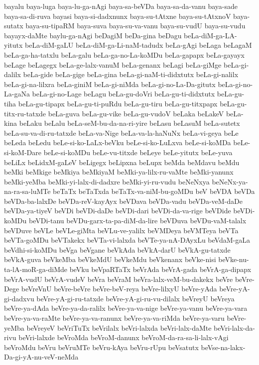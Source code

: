 {bayalu
baya-luga
baya-lu-ga-nAgi
baya-sa-beVDa
baya-sa-da-vanu
baya-sade
baya-sa-di-ruva
bayasi
baya-si-dadxnunx
baya-su-tAtxne
baya-su-tAtxnoV
baya-sutatx
baya-su-tipaRM
baya-suva
baya-su-va-vanu
baya-su-vudU
baya-su-vudu
bayayx-daMte
baylu-ga-nAgi
beDagiM
beDa-gina
beDagu
beLa-diM-ga-LA-yitutx
beLa-diM-gaLU
beLa-diM-ga-Li-naM-tadudx
beLa-gAgi
beLaga
beLagaM
beLa-ga-ha-tatxlu
beLa-galu
beLa-ga-no-La-koMDu
beLa-gapapx
beLa-gayayx
beLage
beLagegx
beLa-ge-lalx-vanuM
beLa-genanx
beLagi
beLa-giMge
beLa-gi-dalilx
beLa-gide
beLa-gige
beLa-gina
beLa-gi-naM-ti-didxtutx
beLa-gi-nalilx
beLa-gi-na-lilxra
beLa-giniM
beLa-gi-niMda
beLa-gi-no-La-Da-gitutx
beLa-gi-no-La-gaNa
beLa-gi-no-Lage
beLagu
beLa-gu-doVri
beLa-gu-ti-didxtutx
beLa-gu-tiha
beLa-gu-tipapx
beLa-gu-ti-puRdu
beLa-gu-tiru
beLa-gu-titxpapx
beLa-gu-titx-ru-tatxde
beLa-guva
beLa-gu-vike
beLa-gu-vudoV
beLaka
beLakeV
beLa-kina
beLaku
beLalu
beLa-seM-bu-da-na-ri-yire
beLasu
beLasuM
beLa-sutetx
beLa-su-va-di-ru-tatxde
beLa-va-Nige
beLa-va-la-haNuNx
beLa-vi-geya
beLe
beLeda
beLedu
beLe-si-ko-LaLx-beVku
beLe-si-ko-LuLxva
beLe-si-koMDa
beLe-si-koM-Dare
beLe-si-koMDu
beLe-vu-titxde
beLeye
beLe-yitutx
beLe-yuva
beLiLx
beLidxM-gaLeV
beLigegx
beLipxna
beLupx
beMda
beMdavu
beMdu
beMki
beMkige
beMkiya
beMkiyaM
beMki-ya-lilx-ru-vaMte
beMki-yanunx
beMki-yeMba
beMki-yi-lalx-di-dadxre
beMki-yi-ru-vudu
beNeNxya
beNeNx-ya-na-ra-sa-luMTe
beTaTx
beTaTxda
beTaTx-va-niM-bu-goMDu
beV
beVDA
beVDa
beVDa-ba-lalxDe
beVDa-reV-kayAyx
beVDava
beVDa-vadu
beVDa-veM-daDe
beVDa-ya-tiyeV
beVDi
beVDi-daDe
beVDi-dari
beVDi-da-va-rige
beVDide
beVDi-koMDu
beVDi-tanu
beVDu-garx-ta-pa-diM-da-lire
beVDuva
beVDu-vaM-talalx
beVDuve
beVLe
beVLe-giMta
beVLu-ve-yalilx
beVMDeya
beVMTeya
beVTa
beVTa-goMDu
beVTakekx
beVTa-vi-lalxda
beVTe-ya-nA-DAyxLu
beVdaM-gaLa
beVdhi-si-koMDu
beVga
beVgane
beVkAda
beVkA-darU
beVkA-gu-tatxde
beVkA-guva
beVkeMba
beVkeMdU
beVkeMdu
beVkenanx
beVke-nisi
beVke-nu-ta-lA-moR-ga-diMde
beVku
beVpaRTaTx
beVrAda
beVrA-gada
beVrA-ga-dipapx
beVrA-vudU
beVrA-vudeV
beVra
beVraM
beVra-lalx-veM-bu-dakekx
beVre
beVre-Dege
beVreVnU
beVre-beVre
beVre-beV-reya
beVre-lilxyU
beVre-yAda
beVre-yA-gi-dadxvu
beVre-yA-gi-ru-tatxde
beVre-yA-gi-ru-vu-dilalx
beVreyU
beVreya
beVre-ya-dAda
beVre-ya-da-ralilx
beVre-ya-va-nige
beVre-ya-vanu
beVre-ya-vara
beVre-ya-va-raMte
beVre-ya-va-ranunx
beVre-ya-va-riMda
beVre-ya-varu
beVre-yeMba
beVreyeV
beVriTuTx
beVrilalx
beVri-lalxda
beVri-lalx-daMte
beVri-lalx-da-rivu
beVri-lalxde
beVroMda
beVroM-danunx
beVroM-da-ra-sa-li-lalx-vAgi
beVroMdu
beVru
beVruMTe
beVru-kAya
beVru-rUpu
beVsatutx
beVse-na-lakx-Da-gi-yA-nu-veV-neMda
}
